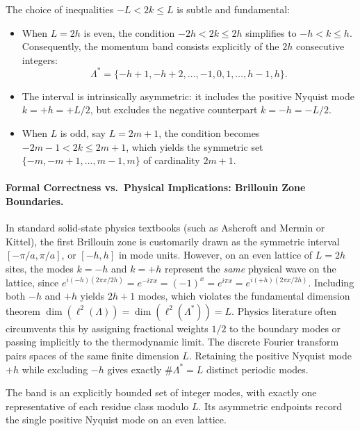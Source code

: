 The choice of inequalities $-L < 2k \le L$ is subtle and fundamental:
\begin{itemize}
    \item When $L = 2h$ is even, the condition $-2h < 2k \le 2h$ simplifies to $-h < k \le h$. Consequently, the momentum band consists explicitly of the $2h$ consecutive integers:
    \begin{equation}
    \Lambda^* = \{-h+1, -h+2, \dots, -1, 0, 1, \dots, h-1, h\}.
    \end{equation}
    \item The interval is intrinsically asymmetric: it includes the positive Nyquist mode $k = +h = +L/2$, but excludes the negative counterpart $k = -h = -L/2$.
    \item When $L$ is odd, say $L = 2m+1$, the condition becomes $-2m-1 < 2k \le 2m+1$, which yields the symmetric set $\{-m, -m+1, \dots, m-1, m\}$ of cardinality $2m+1$.
\end{itemize}

\paragraph{Formal Correctness vs.\ Physical Implications: Brillouin Zone Boundaries.}
In standard solid-state physics textbooks (such as Ashcroft and Mermin or Kittel), the first Brillouin zone is customarily drawn as the symmetric interval $[-\pi/a, \pi/a]$, or $[-h, h]$ in mode units. However, on an even lattice of $L = 2h$ sites, the modes $k = -h$ and $k = +h$ represent the \emph{same} physical wave on the lattice, since $e^{i (-h) (2\pi x / 2h)} = e^{-i \pi x} = (-1)^x = e^{i \pi x} = e^{i (+h) (2\pi x / 2h)}$.
Including both $-h$ and $+h$ yields $2h+1$ modes, which violates the fundamental dimension theorem $\dim(\ell^2(\Lambda)) = \dim(\ell^2(\Lambda^*)) = L$. Physics literature often circumvents this by assigning fractional weights $1/2$ to the boundary modes or passing implicitly to the thermodynamic limit. 
The discrete Fourier transform pairs spaces of the same finite dimension $L$. Retaining the positive Nyquist mode $+h$ while excluding $-h$ gives exactly $\#\Lambda^* = L$ distinct periodic modes.

\begin{remark}
The band is an explicitly bounded set of integer modes, with exactly one representative of each residue class modulo $L$. Its asymmetric endpoints record the single positive Nyquist mode on an even lattice.
\end{remark}

